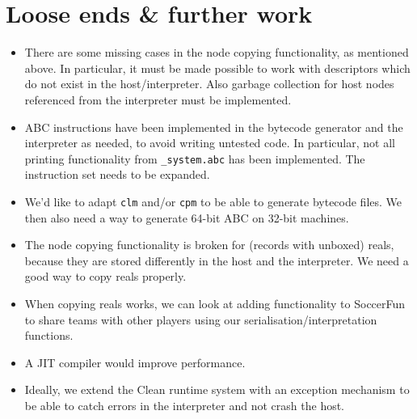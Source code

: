 \documentclass[a4paper]{article}
\begin{document}
\section*{Loose ends \& further work}
\begin{itemize}
	\item
		There are some missing cases in the node copying functionality, as mentioned above.
		In particular, it must be made possible to work with descriptors which do not exist in the host/interpreter.
		Also garbage collection for host nodes referenced from the interpreter must be implemented.
	\item
		ABC instructions have been implemented in the bytecode generator and the interpreter as needed, to avoid writing untested code.
		In particular, not all printing functionality from \texttt{\_system.abc} has been implemented.
		The instruction set needs to be expanded.
	\item
		We'd like to adapt \texttt{clm} and/or \texttt{cpm} to be able to generate bytecode files.
		We then also need a way to generate 64-bit ABC on 32-bit machines.
	\item
		The node copying functionality is broken for (records with unboxed) reals, because they are stored differently in the host and the interpreter.
		We need a good way to copy reals properly.
	\item
		When copying reals works, we can look at adding functionality to SoccerFun to share teams with other players using our serialisation/interpretation functions.
	\item
		A JIT compiler would improve performance.
	\item
		Ideally, we extend the Clean runtime system with an exception mechanism to be able to catch errors in the interpreter and not crash the host.
\end{itemize}
\end{document}
